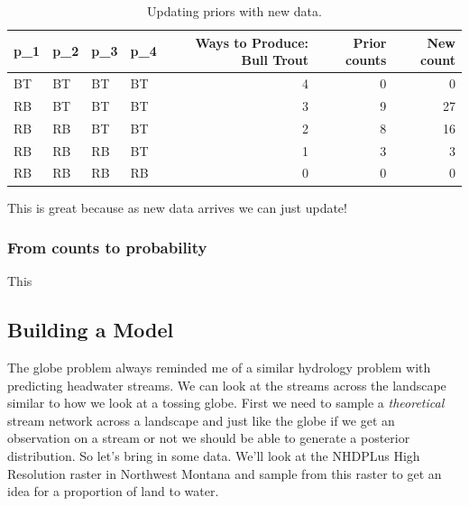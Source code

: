 \documentclass[
]{book}
\begin{document}
\begin{table}

\caption{\label{tab:table-2}Updating priors with new data.}
\centering
\begin{tabular}[t]{l|l|l|l|r|r|r}
\hline
p\_1 & p\_2 & p\_3 & p\_4 & Ways to Produce: Bull Trout & Prior counts & New count\\
\hline
BT & BT & BT & BT & 4 & 0 & 0\\
\hline
RB & BT & BT & BT & 3 & 9 & 27\\
\hline
RB & RB & BT & BT & 2 & 8 & 16\\
\hline
RB & RB & RB & BT & 1 & 3 & 3\\
\hline
RB & RB & RB & RB & 0 & 0 & 0\\
\hline
\end{tabular}
\end{table}

This is great because as new data arrives we can just update!

\hypertarget{from-counts-to-probability}{%
\subsubsection{From counts to probability}\label{from-counts-to-probability}}

This

\hypertarget{building-a-model}{%
\subsection{Building a Model}\label{building-a-model}}

The globe problem always reminded me of a similar hydrology problem with predicting headwater streams. We can look at the streams across the landscape similar to how we look at a tossing globe. First we need to sample a \emph{theoretical} stream network across a landscape and just like the globe if we get an observation on a stream or not we should be able to generate a posterior distribution. So let's bring in some data. We'll look at the NHDPLus High Resolution raster in Northwest Montana and sample from this raster to get an idea for a proportion of land to water.
\end{document}
